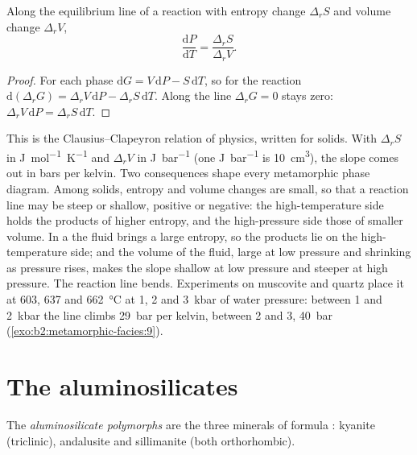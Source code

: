 \begin{proposition}\label{prop:b2:metamorphic-facies:clapeyron}
Along the equilibrium line of a reaction with entropy change $\Delta_r S$ and volume
change $\Delta_r V$,
\[
\frac{\mathrm dP}{\mathrm dT} = \frac{\Delta_r S}{\Delta_r V}.
\]
\end{proposition}

\begin{proof}
For each phase $\mathrm dG = V\,\mathrm dP - S\,\mathrm dT$, so for the reaction
$\mathrm d(\Delta_r G) = \Delta_r V\,\mathrm dP - \Delta_r S\,\mathrm dT$. Along the line
$\Delta_r G = 0$ stays zero: $\Delta_r V\,\mathrm dP = \Delta_r S\,\mathrm dT$.
\end{proof}

This is the Clausius--Clapeyron relation of physics, written for solids. With
$\Delta_r S$ in \unit{J.mol^{-1}.K^{-1}} and $\Delta_r V$ in \unit{J.bar^{-1}} (one
\unit{J.bar^{-1}} is \qty{10}{cm^3}), the slope comes out in bars per kelvin. Two
consequences shape every metamorphic phase diagram. Among solids, entropy and volume
changes are small, so that a reaction line may be steep or shallow, positive or
negative: the high-temperature side holds the products of higher entropy, and the
high-pressure side those of smaller volume. In a  the fluid
brings a large entropy, so the products lie on the high-temperature side; and the volume
of the fluid, large at low pressure and shrinking as pressure rises, makes the slope
shallow at low pressure and steeper at high pressure. The reaction line bends.
Experiments on muscovite and quartz place it at 603, 637 and \qty{662}{\celsius} at 1,
2 and \qty{3}{kbar} of water pressure: between 1 and \qty{2}{kbar} the line climbs
\qty{29}{bar} per kelvin, between 2 and 3, \qty{40}{bar} (\cref{exo:b2:metamorphic-facies:9}).

\section{The aluminosilicates}\label{sec:b2:metamorphic-facies:al2sio5}

\begin{definition}\label{def:b2:metamorphic-facies:al2sio5}
The \emph{aluminosilicate polymorphs} are the three
minerals of formula : kyanite (triclinic), andalusite and sillimanite (both
orthorhombic).
\end{definition}

